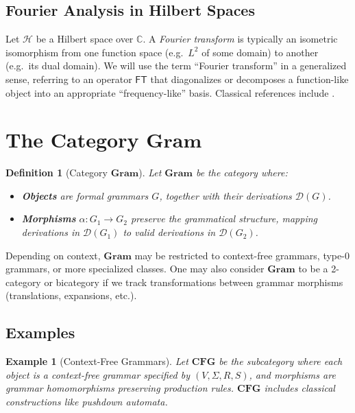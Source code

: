 \documentclass[11pt]{article}
\newtheorem{definition}{Definition}[section]
\newtheorem{example}{Example}[section]
\begin{document}
\subsection{Fourier Analysis in Hilbert Spaces}

Let \(\mathcal{H}\) be a Hilbert space over \(\mathbb{C}\). A \emph{Fourier transform} is typically an isometric isomorphism from one function space (e.g.\ \(L^2\) of some domain) to another (e.g.\ its dual domain). We will use the term ``Fourier transform'' in a generalized sense, referring to an operator \(\mathsf{FT}\) that diagonalizes or decomposes a function-like object into an appropriate ``frequency-like'' basis. Classical references include \cite{folland}.

\section{The Category \texorpdfstring{\(\mathbf{Gram}\)}{Gram}}

\begin{definition}[Category \(\mathbf{Gram}\)]
Let \(\mathbf{Gram}\) be the category where:
\begin{itemize}
    \item \textbf{Objects} are formal grammars \(G\), together with their derivations \(\mathcal{D}(G)\).
    \item \textbf{Morphisms} \(\alpha : G_1 \to G_2\) preserve the grammatical structure, mapping derivations in \(\mathcal{D}(G_1)\) to valid derivations in \(\mathcal{D}(G_2)\).
\end{itemize}
\end{definition}

Depending on context, \(\mathbf{Gram}\) may be restricted to context-free grammars, type-0 grammars, or more specialized classes. One may also consider \(\mathbf{Gram}\) to be a 2-category or bicategory if we track transformations between grammar morphisms (translations, expansions, etc.).

\subsection{Examples}

\begin{example}[Context-Free Grammars]
Let \(\mathbf{CFG}\) be the subcategory where each object is a context-free grammar specified by \((V, \Sigma, R, S)\), and morphisms are grammar homomorphisms preserving production rules. \(\mathbf{CFG}\) includes classical constructions like pushdown automata.
\end{example}
\end{document}
